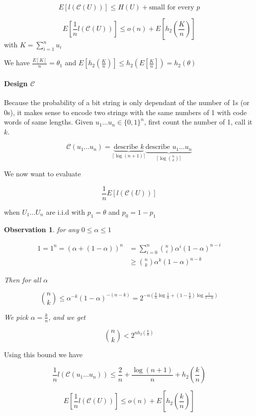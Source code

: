 \documentclass{article}
\newtheorem{observation}{Observation}[section]
\theoremstyle{definition} %
\newcommand{\Ex}[1]{E\left[#1\right]}
\newcommand{\pfrac}[2]{\left( \frac{#1}{#2} \right)}
\def\C{\mathscr{C}}
\begin{document}
\[
  \Ex{l(\C(U))} \leq H(U) + \text{small for every } p
\]

\[
  \Ex{\frac 1 n l(\C(U))} \leq o(n) + \Ex{h_2 \pfrac K n}
\]
with $K = \sum_{i=1}^n u_i$

We have $\frac {\Ex{K}} n = \theta_1$ and $\Ex{h_2\pfrac K n} \leq h_2 \left(\Ex{\frac K n} \right) = h_2(\theta)$

\paragraph{Design $\C$}
Because the probability of a bit string is only dependant of the number of
1s (or 0s), it makes sense to encode two strings with the same numbers of 1
with code words of same lengths.
Given $u_1 \dots u_n \in \{0,1\}^n$, first count the number of 1, call it $k$.


\[
  \C(u_1 \dots u_n) =
  \underbrace{\text{describe } k}_{\lceil \log (n+1)\rceil}
  \underbrace{\text{describe } u_1 \dots u_n}_{\lceil \log {n \choose k}\rceil}
\]

We now want to evaluate

\[
  \frac 1 n \Ex{l(\C(U))}
\]

when $U_1 \dots U_n$ are i.i.d with $p_1 = \theta$ and $p_0 = 1 - p_1$

\begin{observation}

for any $0 \leq \alpha \leq 1$

\begin{align*}
  1 = 1^n = (\alpha + (1-\alpha))^n &= \sum_{i=0}^n {n \choose i} \alpha^i (1-\alpha)^{n-i}\\
  & \geq {n \choose k} \alpha^k (1-\alpha)^{n-k}
\end{align*}

Then for all $\alpha$

\[
{n \choose k} \leq \alpha^{-k}(1-\alpha)^{-(n-k)} = 2^{-n(\frac k n \log \frac 1 \alpha + (1-\frac k n) \log \frac 1 {1-\alpha})}
\]

We pick $\alpha = \frac k n$, and we get

\[
  {n \choose k} < 2^{n h_2 \pfrac k n}
\]

\end{observation}

Using this bound we have

\[
  \frac 1 n l(\C(u_1 \dots u_n)) \leq \frac 2 n + \frac {\log (n+1)} n + h_2\pfrac k n
\]

\[
  \Ex{\frac 1 n l(\C(U))} \leq o(n) + \Ex{h_2 \pfrac k n}
\]
\end{document}
